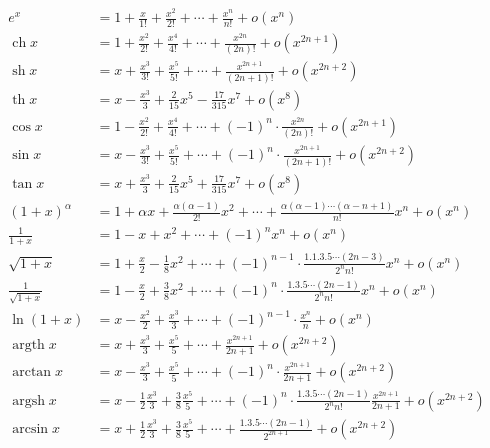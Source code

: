 \begin{align} 
    e^x & =1+\frac{x}{1!}+\frac{x^2}{2!}+\cdots+\frac{x^n}{n!}+o\left(x^n\right) \\ 
    \operatorname{ch} x & =1+\frac{x^2}{2!}+\frac{x^4}{4!}+\cdots+\frac{x^{2 n}}{(2 n)!}+o\left(x^{2 n+1}\right) 
    \\ \operatorname{sh} x & =x+\frac{x^3}{3!}+\frac{x^5}{5!}+\cdots+\frac{x^{2 n+1}}{(2 n+1)!}+o\left(x^{2 n+2}\right) \\
    \operatorname{th} x & =x-\frac{x^3}{3}+\frac{2}{15} x^5-\frac{17}{315} x^7+o\left(x^8\right) \\
    \cos x & =1-\frac{x^2}{2!}+\frac{x^4}{4!}+\cdots+(-1)^n \cdot \frac{x^{2 n}}{(2 n)!}+o\left(x^{2 n+1}\right) \\
    \sin x & =x-\frac{x^3}{3!}+\frac{x^5}{5!}+\cdots+(-1)^n \cdot \frac{x^{2 n+1}}{(2 n+1)!}+o\left(x^{2 n+2}\right) \\
    \tan x & =x+\frac{x^3}{3}+\frac{2}{15} x^5+\frac{17}{315} x^7+o\left(x^8\right) \\
    (1+x)^\alpha & =1+\alpha x+\frac{\alpha(\alpha-1)}{2!} x^2+\cdots+\frac{\alpha(\alpha-1) \cdots(\alpha-n+1)}{n!} x^n+o\left(x^n\right)\\
    \frac{1}{1+x} & =1-x+x^2+\cdots+(-1)^n x^n+o\left(x^n\right) \\
    \sqrt{1+x} & =1+\frac{x}{2}-\frac{1}{8} x^2+\cdots+(-1)^{n-1} \cdot \frac{1.1 .3 .5 \cdots(2 n-3)}{2^n n!} x^n+o\left(x^n\right) \\
    \frac{1}{\sqrt{1+x}} & =1-\frac{x}{2}+\frac{3}{8} x^2+\cdots+(-1)^n \cdot \frac{1.3 .5 \cdots(2 n-1)}{2^n n!} x^n+o\left(x^n\right) \\
    \ln (1+x) & =x-\frac{x^2}{2}+\frac{x^3}{3}+\cdots+(-1)^{n-1} \cdot \frac{x^n}{n}+o\left(x^n\right) \\
    \operatorname{argth} x & =x+\frac{x^3}{3}+\frac{x^5}{5}+\cdots+\frac{x^{2 n+1}}{2 n+1}+o\left(x^{2 n+2}\right) \\
    \arctan x & =x-\frac{x^3}{3}+\frac{x^5}{5}+\cdots+(-1)^n \cdot \frac{x^{2 n+1}}{2 n+1}+o\left(x^{2 n+2}\right) \\
    \operatorname{argsh} x & =x-\frac{1}{2} \frac{x^3}{3}+\frac{3}{8} \frac{x^5}{5}+\cdots+(-1)^n \cdot \frac{1.3 .5 \cdots(2 n-1)}{2^n n!} \frac{x^{2 n+1}}{2 n+1}+o\left(x^{2 n+2}\right) \\
    \arcsin x & =x+\frac{1}{2} \frac{x^3}{3}+\frac{3}{8} \frac{x^5}{5}+\cdots+\frac{1.3 .5 \cdots(2 n-1)}{2^{2 n+1}}+o\left(x^{2 n+2}\right)
\end{align}